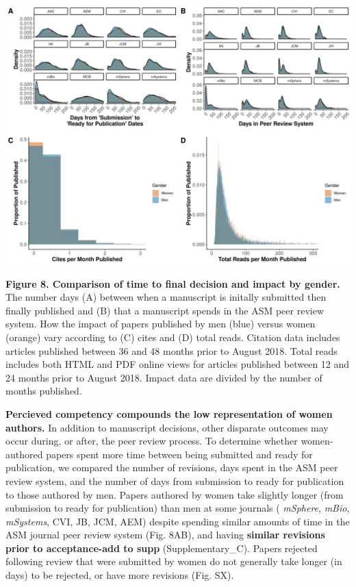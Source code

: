 \documentclass[11pt,]{article}
\begin{document}
\includegraphics{Figure_9.png}

\textbf{Figure 8. Comparison of time to final decision and impact by
gender.} The number days (A) between when a manuscript is initally
submitted then finally published and (B) that a manuscript spends in the
ASM peer review system. How the impact of papers published by men (blue)
versus women (orange) vary according to (C) cites and (D) total reads.
Citation data includes articles published between 36 and 48 months prior
to August 2018. Total reads includes both HTML and PDF online views for
articles published between 12 and 24 months prior to August 2018. Impact
data are divided by the number of months published.

\textbf{Percieved competency compounds the low representation of women
authors.} In addition to manuscript decisions, other disparate outcomes
may occur during, or after, the peer review process. To determine
whether women-authored papers spent more time between being submitted
and ready for publication, we compared the number of revisions, days
spent in the ASM peer review system, and the number of days from
submission to ready for publication to those authored by men. Papers
authored by women take slightly longer (from submission to ready for
publication) than men at some journals ( \emph{mSphere}, \emph{mBio},
\emph{mSystems}, CVI, JB, JCM, AEM) despite spending similar amounts of
time in the ASM journal peer review system (Fig. 8AB), and having
\textbf{similar revisions prior to acceptance-add to supp}
(Supplementary\_C). Papers rejected following review that were submitted
by women do not generally take longer (in days) to be rejected, or have
more revisions (Fig. SX).
\end{document}
